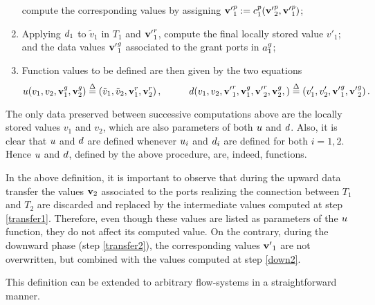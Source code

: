 \begin{definition}
\begin{enumerate}
    compute the corresponding values by assigning
    $\portdata{v'}^p_1 := \combine[p]_1(\portdata{v'}^p_2, \portdata{v'}^p_1)$;
  \item \label{down1} Applying $\down_1$ to $\tilde{v}_1$ in $T_1$ and
    $\request{\portdata{v'}}_1$, compute the final locally stored value
    $v'_1$;  and the data values $\grant{\portdata{v'}}_1$ associated to the
    grant ports in $\grant{a}_1$;
  \item \label{final} Function values to be defined are then given by the
    two equations
    \[
    \up(v_1, v_2, \grant{\portdata{v}}_1, \grant{\portdata{v}}_2)
    \bydef{=}
    (\tilde{v}_1, \tilde{v}_2, 
    \request{\portdata{v}}_1, \request{\portdata{v}}_2)\,,
    \hspace{1cm}
    \down(v_1, v_2, 
      \request{\portdata{v'}}_1, 
      \grant{\portdata{v}}_1, 
      \request{\portdata{v'}}_2, 
      \grant{\portdata{v}}_2, 
    )
    \bydef{=}
    (v'_1, v'_2, 
      \grant{\portdata{v'}}_1, 
      \grant{\portdata{v'}}_2
    )\,.
    \]
  \end{enumerate}
  The only data preserved between successive computations above are the
  locally stored values $v_1$ and $v_2$, which are also parameters of both
  $\up$ and $\down$.  Also, it is clear that $\up$ and $\down$ are defined
  whenever $\up_i$ and $\down_i$ are defined for both $i = 1,2$.  Hence
  $\up$ and $\down$, defined by the above procedure, are, indeed,
  functions.
\end{definition}

\begin{note}
  \label{rem:transfer}
  In the above definition, it is important to observe that during the upward
  data transfer the values $\portdata{v}_2$ associated to the ports realizing
  the connection between $T_1$ and $T_2$ are discarded and replaced by the
  intermediate values computed at step \ref{transfer1}.  Therefore, even
  though these values are listed as parameters of the $\up$ function, they do
  not affect its computed value.  On the contrary, during the downward phase
  (step \ref{transfer2}), the corresponding values $\portdata{v'}_1$ are not
  overwritten, but combined with the values computed at step \ref{down2}.
\end{note}

This definition can be extended to arbitrary flow-systems in a
straightforward manner.


